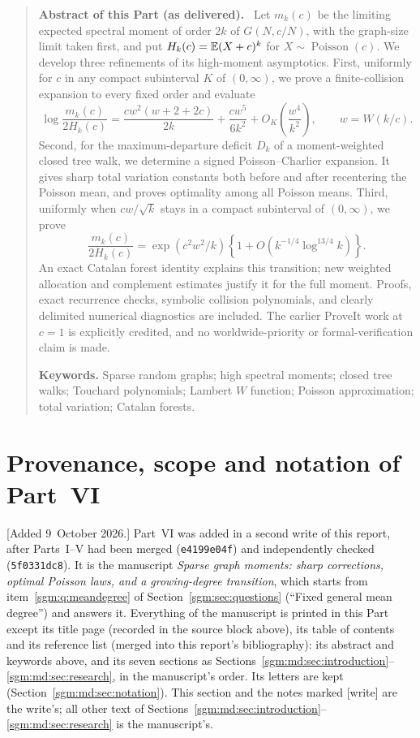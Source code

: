 \documentclass[11pt,letterpaper]{article}
\theoremstyle{remark}\newtheorem{remark}[theorem]{Remark}
\newcommand{\Poi}{\operatorname{Poisson}}\newcommand{\Bin}{\operatorname{Bin}}
\newcommand{\file}[1]{\nolinkurl{#1}}
\newenvironment{partabstract}{\begin{quote}\small\noindent\textbf{Abstract of this Part (as delivered).}\ }{\end{quote}}
\theoremstyle{definition}\newtheorem{definition}[theorem]{Definition}
\begin{document}
\begin{partabstract}
Let $m_k(c)$ be the limiting expected spectral moment of order $2k$ of
$G(N,c/N)$, with the graph-size limit taken first, and put
$H_k(c)=\mathbb E(X+c)^k$ for $X\sim\Poi(c)$. We develop three refinements
of its high-moment asymptotics. First, uniformly for $c$ in any compact
subinterval $K$ of $(0,\infty)$, we prove a finite-collision expansion to
every fixed order and evaluate
\[
 \log\frac{m_k(c)}{2H_k(c)}
 =\frac{cw^2(w+2+2c)}{2k}
   +\frac{cw^5}{6k^2}+O_K\!\left(\frac{w^4}{k^2}\right),
 \qquad w=W(k/c).
\]
Second, for the maximum-departure deficit $D_k$ of a moment-weighted
closed tree walk, we determine a signed Poisson--Charlier expansion.
It gives sharp total variation constants both before and after
recentering the Poisson mean, and proves optimality among all Poisson
means. Third, uniformly when $cw/\sqrt{k}$ stays in a compact
subinterval of $(0,\infty)$, we prove
\[
 \frac{m_k(c)}{2H_k(c)}
 =\exp(c^2w^2/k)
   \left\{1+O\!\left(k^{-1/4}\log^{13/4}k\right)\right\}.
\]
An exact Catalan forest identity explains this transition; new weighted
allocation and complement estimates justify it for the full moment.
Proofs, exact recurrence checks, symbolic collision polynomials, and
clearly delimited numerical diagnostics are included. The earlier
ProveIt work at $c=1$ is explicitly credited, and no worldwide-priority
or formal-verification claim is made.

\smallskip\noindent
\textbf{Keywords.} Sparse random graphs; high spectral moments;
closed tree walks; Touchard polynomials; Lambert $W$ function;
Poisson approximation; total variation; Catalan forests.
\end{partabstract}

\section{Provenance, scope and notation of Part~VI}\label{sgm:md:sec:front}

[Added 9~October 2026.] Part~VI was added in a second write of this report,
after Parts~I--V had been merged (\file{e4199e04f}) and independently checked
(\file{5f0331dc8}). It is the manuscript \emph{Sparse graph moments: sharp
corrections, optimal Poisson laws, and a growing-degree transition}, which
starts from item~\ref{sgm:q:meandegree} of Section~\ref{sgm:sec:questions}
(``Fixed general mean degree'') and answers it. Everything of the manuscript
is printed in this Part except its title page (recorded in the source block
above), its table of contents and its reference list (merged into this
report's bibliography): its abstract and keywords above, and its seven
sections as Sections~\ref{sgm:md:sec:introduction}--\ref{sgm:md:sec:research},
in the manuscript's order. Its letters are kept
(Section~\ref{sgm:md:sec:notation}). This section and the notes marked
[write] are the write's; all other text of
Sections~\ref{sgm:md:sec:introduction}--\ref{sgm:md:sec:research} is the
manuscript's.
\end{document}
